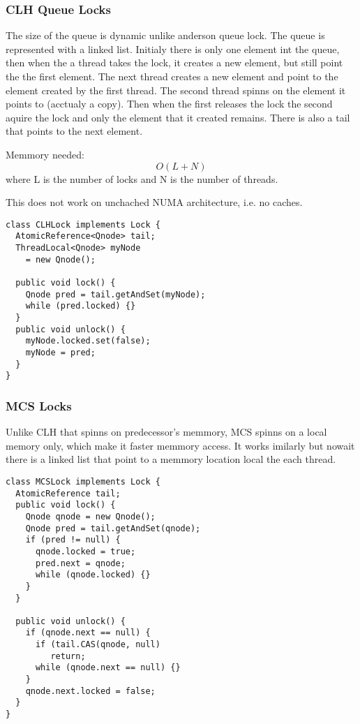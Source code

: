 \subsubsection{CLH Queue Locks}
The size of the queue is dynamic unlike anderson queue lock.
The queue is represented with a linked list.
Initialy there is only one element int the queue, then when
the a thread takes the lock, it creates a new element, but still
point the the first element. The next thread creates a new
element and point to the element created by the first thread.
The second thread spinns on the element it points to (acctualy a copy).
Then when the first releases the lock the second aquire the lock and
only the element that it created remains.
There is also a tail that points to the next element.

Memmory needed:
\begin{equation}
  O(L+N)
\end{equation}
where L is the number of locks and N is the number of threads.

This does not work on unchached NUMA architecture, i.e. no caches.

\begin{BVerbatim}[baseline=c]
class CLHLock implements Lock {
  AtomicReference<Qnode> tail;
  ThreadLocal<Qnode> myNode
    = new Qnode();

  public void lock() {
    Qnode pred = tail.getAndSet(myNode);
    while (pred.locked) {}
  }
  public void unlock() {
    myNode.locked.set(false);
    myNode = pred;
  }
}
\end{BVerbatim}

\subsubsection{MCS Locks}
Unlike CLH that spinns on predecessor’s memmory, MCS spinns on a local
memory only, which make it faster memmory access. It works imilarly but nowait
there is a linked list that point to a memmory location local the each thread.

\begin{BVerbatim}[baseline=c]
class MCSLock implements Lock {
  AtomicReference tail;
  public void lock() {
    Qnode qnode = new Qnode();
    Qnode pred = tail.getAndSet(qnode);
    if (pred != null) {
      qnode.locked = true;
      pred.next = qnode;
      while (qnode.locked) {}
    }
  }

  public void unlock() {
    if (qnode.next == null) {
      if (tail.CAS(qnode, null)
         return;
      while (qnode.next == null) {}
    }
    qnode.next.locked = false;
  }
}
\end{BVerbatim}


